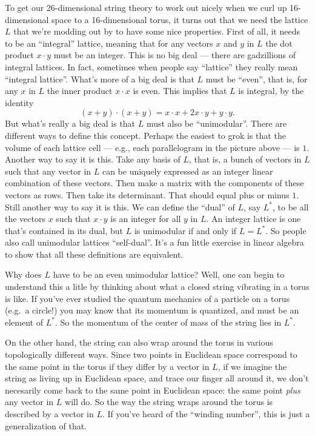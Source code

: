 \documentclass{article}
\begin{document}
To get our 26-dimensional string theory to work out nicely when we curl
up 16-dimensional space to a 16-dimensional torus, it turns out that we
need the lattice \(L\) that we're modding out by to have some nice
properties. First of all, it needs to be an ``integral'' lattice,
meaning that for any vectors \(x\) and \(y\) in \(L\) the dot product
\(x\cdot y\) must be an integer. This is no big deal --- there are
gadzillions of integral lattices. In fact, sometimes when people say
``lattice'' they really mean ``integral lattice''. What's more of a big
deal is that \(L\) must be ``even'', that is, for any \(x\) in \(L\) the
inner product \(x\cdot x\) is even. This implies that \(L\) is integral,
by the identity
\[(x + y)\cdot (x + y) = x\cdot x + 2x\cdot y + y\cdot y.\] But what's
really a big deal is that \(L\) must also be ``unimodular''. There are
different ways to define this concept. Perhaps the easiest to grok is
that the volume of each lattice cell --- e.g., each parallelogram in the
picture above --- is \(1\). Another way to say it is this. Take any
basis of \(L\), that is, a bunch of vectors in \(L\) such that any
vector in \(L\) can be uniquely expressed as an integer linear
combination of these vectors. Then make a matrix with the components of
these vectors as rows. Then take its determinant. That should equal plus
or minus \(1\). Still another way to say it is this. We can define the
``dual'' of \(L\), say \(L^*\), to be all the vectors \(x\) such that
\(x\cdot y\) is an integer for all \(y\) in \(L\). An integer lattice is
one that's contained in its dual, but \(L\) is unimodular if and only if
\(L = L^*\). So people also call unimodular lattices ``self-dual''. It's
a fun little exercise in linear algebra to show that all these
definitions are equivalent.

Why does \(L\) have to be an even unimodular lattice? Well, one can
begin to understand this a litle by thinking about what a closed string
vibrating in a torus is like. If you've ever studied the quantum
mechanics of a particle on a torus (e.g.~a circle!) you may know that
its momentum is quantized, and must be an element of \(L^*\). So the
momentum of the center of mass of the string lies in \(L^*\).

On the other hand, the string can also wrap around the torus in various
topologically different ways. Since two points in Euclidean space
correspond to the same point in the torus if they differ by a vector in
\(L\), if we imagine the string as living up in Euclidean space, and
trace our finger all around it, we don't necesarily come back to the
same point in Euclidean space: the same point \emph{plus} any vector in
\(L\) will do. So the way the string wraps around the torus is described
by a vector in \(L\). If you've heard of the ``winding number'', this is
just a generalization of that.
\end{document}
